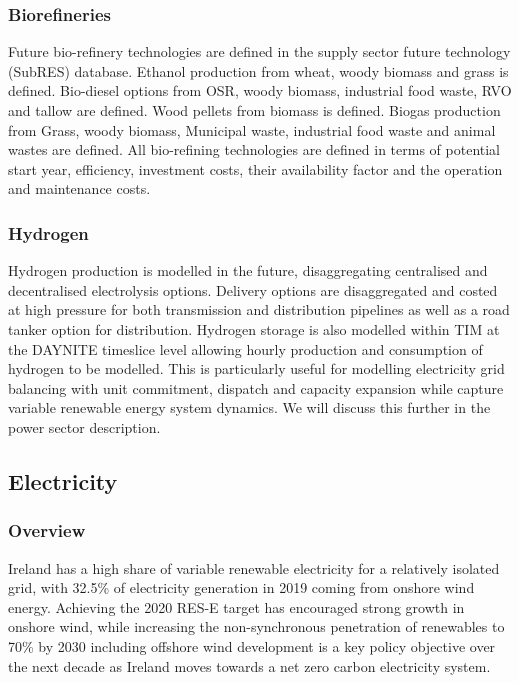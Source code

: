 \documentclass[gmd,manuscript]{copernicus}
\begin{document}
\subsubsection{Biorefineries}
Future bio-refinery technologies are defined in the supply sector future technology (SubRES) database. Ethanol production from wheat, woody biomass and grass is defined. Bio-diesel options from OSR, woody biomass, industrial food waste, RVO and tallow are defined. Wood pellets from biomass is defined. Biogas production from Grass, woody biomass, Municipal waste, industrial food waste and animal wastes are defined. All bio-refining technologies are defined in terms of potential start year, efficiency, investment costs, their availability factor and the operation and maintenance costs.

\subsubsection{Hydrogen}
Hydrogen production is modelled in the future, disaggregating centralised and decentralised electrolysis options. Delivery options are disaggregated and costed at high pressure for both transmission and distribution pipelines as well as a road tanker option for distribution. Hydrogen storage is also modelled within TIM at the DAYNITE timeslice level allowing hourly production and consumption of hydrogen to be modelled. This is particularly useful for modelling electricity grid balancing with unit commitment, dispatch and capacity expansion while capture variable renewable energy system dynamics. We will discuss this further in the power sector description. 

\subsection{Electricity}
\label{ss:power}

\subsubsection{Overview}
Ireland has a high share of variable renewable electricity for a relatively isolated grid, with 32.5\% of electricity generation in 2019 coming from onshore wind energy. Achieving the 2020 RES-E target has encouraged strong growth in onshore wind, while increasing the non-synchronous penetration of renewables to 70\% by 2030 including offshore wind development is a key policy objective over the next decade as Ireland moves towards a net zero carbon electricity system. 
\end{document}
